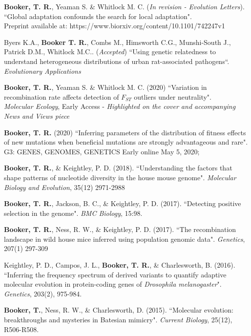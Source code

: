 \documentclass[11pt]{article}
\makeatletter
\newlength{\bibhang}
\newlength{\bibsep}
 {\@listi \global\bibsep\itemsep \global\advance\bibsep by\parsep}
\newenvironment{bibsection}%
        {\begin{etaremune}{}{%
       \setlength{\leftmargin}{\bibhang}%
       \setlength{\itemindent}{-\leftmargin}%
       \setlength{\itemsep}{\bibsep}%
       \setlength{\parsep}{\z@}%
        \setlength{\partopsep}{0pt}%
        \setlength{\topsep}{0pt}}}
        {\end{etaremune}\vspace{-.6\baselineskip}}
\renewcommand{\section}[1]{\pagebreak[3]%
    \hyphenpenalty=10000%
    \vspace{1.3\baselineskip}%
    \phantomsection\addcontentsline{toc}{section}{#1}%
    \noindent\llap{\scshape\smash{\parbox[t]{\marginparwidth}{\raggedright #1}}}%
    \vspace{-\baselineskip}\par}
\makeatother
\begin{document}
\section{Papers}
\vspace{-.1275in}
\begin{bibsection}


    \item {\bf Booker, T. R.}, Yeaman S. \& Whitlock M. C. (\emph{In revision - Evolution Letters}). ``Global adaptation confounds the search for local adaptation". \\
     Preprint available at: https://www.biorxiv.org/content/10.1101/742247v1


	\item Byers K.A., {\bf Booker T. R.}, Combs M., Himsworth C.G., Munshi-South J., Patrick D.M., Whitlock M.C.. (\emph{Accepted})  ``Using genetic relatedness to understand heterogeneous distributions of urban rat-associated pathogens``. \emph{Evolutionary Applications}

    \item {\bf Booker, T. R.}, Yeaman S. \& Whitlock M. C. (2020) ``Variation in recombination rate affects detection of $F_{ST}$ outliers under neutrality".\\
	\emph{Molecular Ecology}, Early Access - \emph{Highlighted on the cover and accompanying News and Views piece}
   
    \item {\bf Booker, T. R.} (2020) ``Inferring parameters of the distribution of fitness effects of new mutations when beneficial mutations are strongly advantageous and rare". \\
     G3: GENES, GENOMES, GENETICS Early online May 5, 2020;

    \item {\bf Booker, T. R.}, \& Keightley, P. D. (2018). ``Understanding the factors that shape patterns of nucleotide diversity in the house mouse genome". \emph{Molecular Biology and Evolution}, 35(12) 2971-2988
    
   \item {\bf Booker, T. R.}, Jackson, B. C., \& Keightley, P. D. (2017). ``Detecting positive selection in the genome". \emph{BMC Biology}, 15:98. 

	\item {\bf Booker, T. R.}, Ness, R. W., \& Keightley, P. D. (2017). ``The recombination landscape in wild house mice inferred using population genomic data". \emph{Genetics}, 207(1) 297-309

	\item Keightley, P. D., Campos, J. L., {\bf Booker, T. R.}, \& Charlesworth, B. (2016). ``Inferring the frequency spectrum of derived variants to quantify adaptive molecular evolution in protein-coding genes of \textit{Drosophila melanogaster}". \emph{Genetics}, 203(2), 975-984.
	
	\item {\bf Booker, T.}, Ness, R. W., \& Charlesworth, D. (2015). ``Molecular evolution: breakthroughs and mysteries in Batesian mimicry". \emph{Current Biology}, 25(12), R506-R508.

\end{bibsection}
\end{document}

